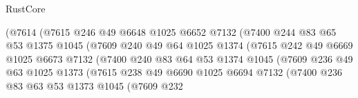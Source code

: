 \begin{lexlean}{RustCore}
\begin{coremodule}
                              (@7614
                                (@7615
                                  @246
                                  @49
                                  @6648
                                  @1025
                                  @6652
                                  @7132
                                  (@7400
                                    @244
                                    @83
                                    @65
                                    @53
                                    @1375
                                    @1045
                                    (@7609
                                      @240
                                      @49
                                      @64
                                      @1025
                                      @1374
                                      (@7615
                                        @242
                                        @49
                                        @6669
                                        @1025
                                        @6673
                                        @7132
                                        (@7400
                                          @240
                                          @83
                                          @64
                                          @53
                                          @1374
                                          @1045
                                          (@7609
                                            @236
                                            @49
                                            @63
                                            @1025
                                            @1373
                                            (@7615
                                              @238
                                              @49
                                              @6690
                                              @1025
                                              @6694
                                              @7132
                                              (@7400
                                                @236
                                                @83
                                                @63
                                                @53
                                                @1373
                                                @1045
                                                (@7609
                                                  @232

\end{coremodule}
\end{lexlean}
